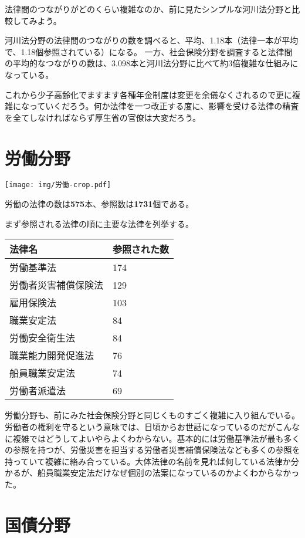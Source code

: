 \documentclass[a5j,openany,twoside]{jsbook}
\begin{document}
法律間のつながりがどのくらい複雑なのか、前に見たシンプルな河川法分野と比較してみよう。

河川法分野の法律間のつながりの数を調べると、平均、1.18本（法律一本が平均で、1.18個参照されている）になる。
一方、社会保険分野を調査すると法律間の平均的なつながりの数は、3.098本と河川法分野に比べて約3倍複雑な仕組みになっている。

これから少子高齢化でますます各種年金制度は変更を余儀なくされるので更に複雑になっていくだろう。何か法律を一つ改正する度に、影響を受ける法律の精査を全てしなければならず厚生省の官僚は大変だろう。

\section{労働分野}

\texttt{[image: img/労働-crop.pdf]}

労働の法律の数は\textbf{575}本、参照数は\textbf{1731}個である。

まず参照される法律の順に主要な法律を列挙する。

\begin{table}[htb]
  \begin{tabular}{|l|l|}  \hline
法律名 & 参照された数 \\ \hline \hline
労働基準法 & 174 \\
労働者災害補償保険法 & 129 \\
雇用保険法 & 103 \\
職業安定法 & 84 \\
労働安全衛生法 & 84 \\
職業能力開発促進法 & 76 \\
船員職業安定法 & 74 \\
労働者派遣法 & 69 \\ \hline
  \end{tabular}
\end{table}

労働分野も、前にみた社会保険分野と同じくものすごく複雑に入り組んでいる。労働者の権利を守るという意味では、日頃からお世話になっているのだがこんなに複雑ではどうしてよいやらよくわからない。基本的には労働基準法が最も多くの参照を持つが、労働災害を担当する労働者災害補償保険法なども多くの参照を持っていて複雑に絡み合っている。大体法律の名前を見れば何している法律か分かるが、船員職業安定法だけなぜ個別の法案になっているのかよくわからなかった。

\clearpage


\section{国債分野}
\end{document}
